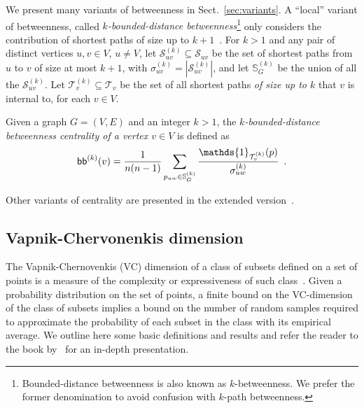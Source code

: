 \ifproof
We present many variants of betweenness in Sect.~\ref{sec:variants}.
\else
A ``local'' variant of betweenness, called \emph{$k$-bounded-distance
betweenness}\footnote{Bounded-distance betweenness is also known as
$k$-betweenness. We prefer the former denomination to avoid confusion with
$k$-path betweenness.} only considers
the contribution of shortest paths of size up to $k+1$~\citep{BorgattiE06,Brandes08}.
For $k>1$ and any pair of distinct vertices $u,v\in V$, $u\neq V$, let
$\mathcal{S}^{(k)}_{uv}\subseteq\mathcal{S}_{uv}$ be the set of shortest paths
from $u$ to $v$ of size at most $k+1$, with
$\sigma^{(k)}_{uv}=|\mathcal{S}^{(k)}_{uv}|$, and let $\mathbb{S}^{(k)}_G$ be the
union of all the $\mathcal{S}^{(k)}_{uv}$. Let
$\mathcal{T}^{(k)}_v\subseteq\mathcal{T}_v$ be the set of all shortest paths
\emph{of size up to $k$} that $v$ is internal to, for each $v\in V$.

\begin{definition}\label{def:kboundbetweenness}
  \citep{BorgattiE06,Brandes08} Given a graph $G=(V,E)$ and an integer $k>1$,
  the \emph{$k$-bounded-distance betweenness centrality of a vertex $v\in V$} is
  defined as
  \[
  \kboundbetw^{(k)}(v)=\frac{1}{n(n-1)}\sum_{p_{uw}\in\mathbb{S}^{(k)}_G}\frac{\mathds{1}_{\mathcal{T}^{(k)}_v}(p)}{\sigma^{(k)}_{uw}}
  \enspace.
  \]
\end{definition}
Other variants of centrality are presented in the extended
version~\citep{RiondatoK13}.
\fi

\subsection{Vapnik-Chervonenkis dimension}\label{sec:prelvcdim}
The Vapnik-Chernovenkis (VC) dimension of a class of subsets defined
on a set of points is a measure of the complexity or expressiveness of such
class~\citep{VapnikC71}. Given a probability distribution on the set of points,
a finite bound on the VC-dimension of the class of subsets implies a bound on
the number of random samples required to approximate the probability of each
subset in the class with its empirical average. We outline here some basic
definitions and results and refer the reader to the book by~\citet{ShalevSBD14}
for an in-depth presentation.

